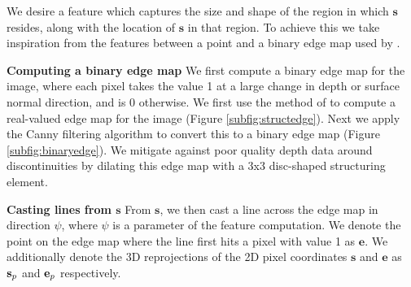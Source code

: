 \documentclass[10pt,twocolumn,letterpaper]{article}
\newcommand{\pixelidx}{\mathbf{s}}
\newcommand{\edgeimidx}{\mathbf{e}}
\newcommand{\point}{\mathbf{p}}
\renewcommand{\paragraph}{\vspace{2pt}\noindent\textbf}
\begin{document}

We desire a feature which captures the size and shape of the region in which $\pixelidx$ resides, along with the location of $\pixelidx$ in that region.
To achieve this we take inspiration from the features between a point and a binary edge map used by \cite{drost-3dimpvt-2012}.

\paragraph{Computing a binary edge map}
We first compute a binary edge map for the image, where each pixel takes the value 1 at a large change in depth or surface normal direction, and is 0 otherwise.
We first use the method of \cite{dollar-iccv-2013} to compute a real-valued edge map for the image (Figure \ref{subfig:structedge}).
Next we apply the Canny filtering algorithm \cite{canny-pami-1986} to convert this to a binary edge map (Figure \ref{subfig:binaryedge}).
We mitigate against poor quality depth data around discontinuities by dilating this edge map with a 3x3 disc-shaped structuring element.



\paragraph{Casting lines from $\pixelidx$}
From $\pixelidx$, we then cast a line across the edge map in direction $\psi$, where $\psi$ is a parameter of the feature computation.
We denote the point on the edge map where the line first hits a pixel with value 1 as $\edgeimidx$.
We additionally denote the 3D reprojections of the 2D pixel coordinates $\pixelidx$ and $\edgeimidx$ as $\pointthreed$ and $\edgethreed$ respectively.
\end{document}
